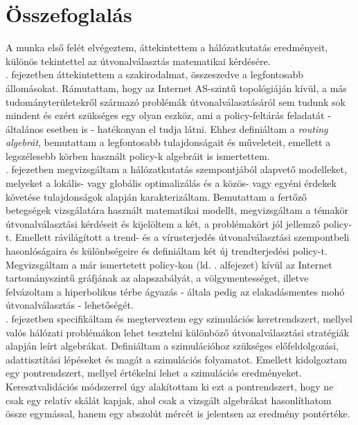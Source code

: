 \chapter{Összefoglalás}\label{summary}

A munka első felét elvégeztem, áttekintettem a hálózatkutatás eredményeit, különös tekintettel az útvonalválasztás matematikai kérdésére.\\

. fejezetben áttekintettem a szakirodalmat, összeszedve a legfontosabb állomásokat. Rámutattam, hogy az Internet AS-szintű topológiáján kívül, a más tudományterületekről származó problémák útvonalválasztásáról sem tudunk sok mindent és ezért szükséges egy olyan eszköz, ami a policy-feltárás feladatát - általános esetben is - hatékonyan el tudja látni. Ehhez definiáltam a \emph{routing algebrát}, bemutattam a legfontosabb tulajdonságait és műveleteit, emellett a legszélesebb körben használt policy-k algebráit is ismertettem.\\

. fejezetben megvizsgáltam a hálózatkutatás szempontjából alapvető modelleket, melyeket a lokális- vagy globális optimalizálás és a közös- vagy egyéni érdekek követése tulajdonságok alapján karakterizáltam. Bemutattam a fertőző betegségek vizsgálatára használt matematikai modellt, megvizsgáltam a témakör útvonalválasztási kérdéseit és kijelöltem a két, a problémakört jól jellemző policy-t. Emellett rávilágított a trend- és a vírusterjedés útvonalválasztási szempontbeli hasonlóságaira és különbségeire és definiáltam két új trendterjedési policy-t.\newline
Megvizsgáltam a már ismertetett policy-kon (ld. . alfejezet) kívül az Internet tartományszintű gráfjának az alapszabályát, a völgymentességet, illetve felvázoltam a hiperbolikus térbe ágyazás - általa pedig az elakadásmentes mohó útvonalválasztás - lehetőségét.\\

. fejezetben specifikáltam és megterveztem egy szimulációs keretrendszert, mellyel valós hálózati problémákon lehet tesztelni különböző útvonalválasztási stratégiák alapján leírt algebrákat. Definiáltam a szimulációhoz szükséges előfeldolgozási, adattisztítási lépéseket és magát a szimulációs folyamatot. Emellett kidolgoztam egy pontrendszert, mellyel értékelni lehet a szimulációs eredményeket. Keresztvalidációs módszerrel úgy alakítottam ki ezt a pontrendszert, hogy ne csak egy relatív skálát kapjak, ahol csak a vizsgált algebrákat hasonlíthatom össze egymással, hanem egy abszolút mércét is jelentsen az eredmény pontértéke.

